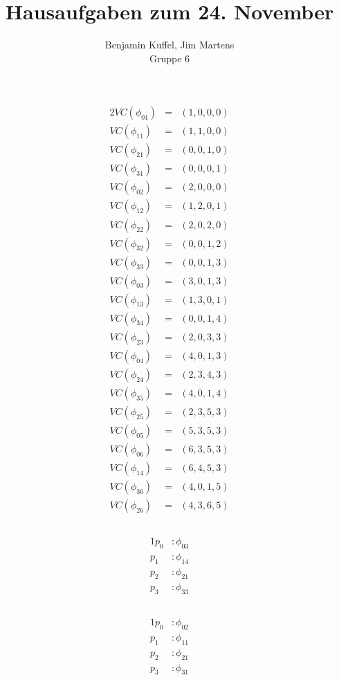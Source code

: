 \documentclass[10pt,a4paper,oneside,ngerman,numbers=noenddot]{scrartcl}
\begin{document}
\author{Benjamin Kuffel, Jim Martens\\Gruppe 6}
\title{Hausaufgaben zum 24. November}
\maketitle

\setcounter{section}{2}
\section{} %
	\subsection{}
	\begin{alignat*}{2}
		VC(\phi_{01}) &=& (1,0,0,0) \\
		VC(\phi_{11}) &=& (1,1,0,0) \\
		VC(\phi_{21}) &=& (0,0,1,0) \\
		VC(\phi_{31}) &=& (0,0,0,1) \\
		VC(\phi_{02}) &=& (2,0,0,0) \\
		VC(\phi_{12}) &=& (1,2,0,1) \\
		VC(\phi_{22}) &=& (2,0,2,0) \\
		VC(\phi_{32}) &=& (0,0,1,2) \\
		VC(\phi_{33}) &=& (0,0,1,3) \\
		VC(\phi_{03}) &=& (3,0,1,3) \\
		VC(\phi_{13}) &=& (1,3,0,1) \\
		VC(\phi_{34}) &=& (0,0,1,4) \\
		VC(\phi_{23}) &=& (2,0,3,3) \\
		VC(\phi_{04}) &=& (4,0,1,3) \\
		VC(\phi_{24}) &=& (2,3,4,3) \\
		VC(\phi_{35}) &=& (4,0,1,4) \\
		VC(\phi_{25}) &=& (2,3,5,3) \\
		VC(\phi_{05}) &=& (5,3,5,3) \\
		VC(\phi_{06}) &=& (6,3,5,3) \\
		VC(\phi_{14}) &=& (6,4,5,3) \\
		VC(\phi_{36}) &=& (4,0,	1,5) \\
		VC(\phi_{26}) &=& (4,3,6,5)
	\end{alignat*}
	
	\subsection{}
	\begin{alignat*}{1}
		p_{0}&: \phi_{03}\\
		p_{1}&: \phi_{14}\\
		p_{2}&: \phi_{21}\\
		p_{3}&: \phi_{33}
	\end{alignat*}
	
	\subsection{}
	\begin{alignat*}{1}
		p_{0}&: \phi_{02}\\
		p_{1}&: \phi_{11}\\
		p_{2}&: \phi_{21}\\
		p_{3}&: \phi_{31}
	\end{alignat*}
\section{} %
\end{document}
